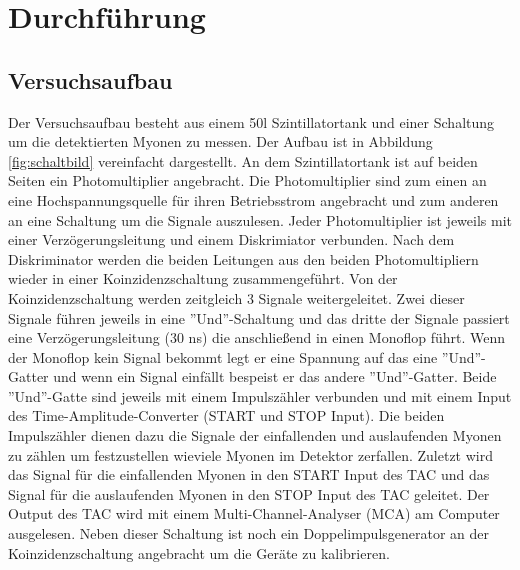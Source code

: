 \section{Durchführung}
\label{sec:Durchfuehrung}
\subsection{Versuchsaufbau}
Der Versuchsaufbau besteht aus einem 50l Szintillatortank und einer Schaltung um die detektierten Myonen zu messen.
Der Aufbau ist in Abbildung \ref{fig:schaltbild} vereinfacht dargestellt.
An dem Szintillatortank ist auf beiden Seiten ein Photomultiplier angebracht.
Die Photomultiplier sind zum einen an eine Hochspannungsquelle für ihren Betriebsstrom angebracht und zum anderen an eine Schaltung um die Signale auszulesen.
Jeder Photomultiplier ist jeweils mit einer Verzögerungsleitung und einem Diskrimiator verbunden.
Nach dem Diskriminator werden die beiden Leitungen aus den beiden Photomultipliern wieder in einer Koinzidenzschaltung zusammengeführt.
Von der Koinzidenzschaltung werden zeitgleich 3 Signale weitergeleitet.
Zwei dieser Signale führen jeweils in eine ''Und''-Schaltung und das dritte der Signale passiert eine Verzögerungsleitung (30 ns) die anschließend in einen Monoflop führt.
Wenn der Monoflop kein Signal bekommt legt er eine Spannung auf das eine ''Und''-Gatter und wenn ein Signal einfällt bespeist er das andere ''Und''-Gatter.
Beide ''Und''-Gatte sind jeweils mit einem Impulszähler verbunden und mit einem Input des Time-Amplitude-Converter (START und STOP Input).
Die beiden Impulszähler dienen dazu die Signale der einfallenden und auslaufenden Myonen zu zählen um festzustellen wieviele Myonen im Detektor zerfallen.
Zuletzt wird das Signal für die einfallenden Myonen in den START Input des TAC und das Signal für die auslaufenden Myonen in den STOP Input des TAC geleitet.
Der Output des TAC wird mit einem Multi-Channel-Analyser (MCA) am Computer ausgelesen.
Neben dieser Schaltung ist noch ein Doppelimpulsgenerator an der Koinzidenzschaltung angebracht um die Geräte zu kalibrieren.
